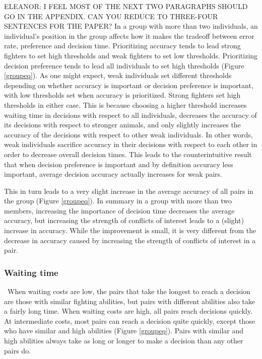 \documentclass{article}
\begin{document}
ELEANOR: I FEEL MOST OF THE NEXT TWO PARAGRAPHS SHOULD GO IN THE APPENDIX. CAN YOU REDUCE TO THREE-FOUR SENTENCES FOR THE PAPER? In a group with more than two individuals, an individual's position in the group affects how it makes the tradeoff between error rate, preference and decision time. Prioritizing accuracy tends to lead strong fighters to set high thresholds and weak fighters to set low thresholds. Prioritizing decision preference tends to lead all individuals to set high thresholds (Figure \ref{groupeq}). As one might expect, weak individuals set different thresholds depending on whether accuracy is important or decision preference is important, with low thresholds set when accuracy is prioritized. Strong fighters set high thresholds in either case. This is because choosing a higher threshold increases waiting time in decisions with respect to all individuals, decreases the accuracy of its decisions with respect to stronger animals, and only slightly increases the accuracy of the decisions with respect to other weak individuals. In other words, weak individuals sacrifice accuracy in their decisions with respect to each other in order to decrease overall decision times. This leads to the counterintuitive result that when decision preference is important and by definition accuracy less important, average decision accuracy actually increases for weak pairs.

This in turn leads to a very slight increase in the average accuracy of all pairs in the group (Figure \ref{groupeq}). In summary in a group with more than two members, increasing the importance of decision time decreases the average accuracy, but increasing the strength of conflicts of interest leads to a (slight) increase in accuracy. While the improvement is small, it is very different from the decrease in accuracy caused by increasing the strength of conflicts of interest in a pair. 

\subsubsection*{Waiting time }
\ When waiting costs are low, the pairs that take the longest to reach a decision are those with similar fighting abilities, but pairs with different abilities also take a fairly long time.  When waiting costs are high, all pairs reach decisions quickly.  At intermediate costs, most pairs can reach a decision quite quickly, except those who have similar and high abilities (Figure \ref{groupeq}).  Pairs with similar and high abilities always take as long or longer to make a decision than any other pairs do.
\end{document}
